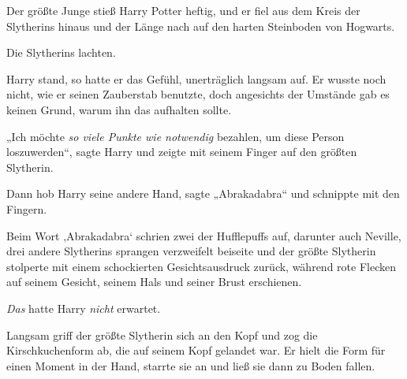Der größte Junge stieß Harry Potter heftig, und er fiel aus dem Kreis der Slytherins hinaus und der Länge nach auf den harten Steinboden von Hogwarts.

Die Slytherins lachten.

Harry stand, so hatte er das Gefühl, unerträglich langsam auf. Er wusste noch nicht, wie er seinen Zauberstab benutzte, doch angesichts der Umstände gab es keinen Grund, warum ihn das aufhalten sollte.

„Ich möchte \emph{so viele Punkte wie notwendig} bezahlen, um diese Person loszuwerden“, sagte Harry und zeigte mit seinem Finger auf den größten Slytherin.

Dann hob Harry seine andere Hand, sagte
„Abrakadabra“ und schnippte mit den Fingern.

Beim Wort ‚Abrakadabra‘ schrien zwei der Hufflepuffs auf, darunter auch Neville, drei andere Slytherins sprangen verzweifelt beiseite und der größte Slytherin stolperte mit einem schockierten Gesichtsausdruck zurück, während rote Flecken auf seinem Gesicht, seinem Hals und seiner Brust erschienen.

\emph{Das} hatte Harry \emph{nicht} erwartet.

Langsam griff der größte Slytherin sich an den Kopf und zog die Kirschkuchenform ab, die auf seinem Kopf gelandet war. Er hielt die Form für einen Moment in der Hand, starrte sie an und ließ sie dann zu Boden fallen.

